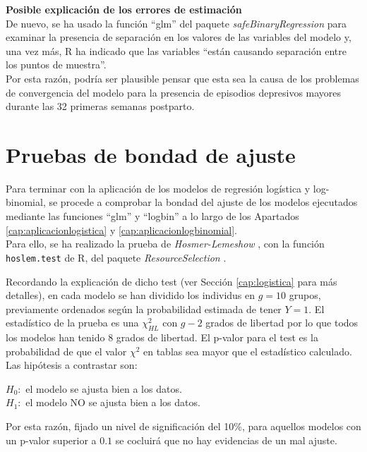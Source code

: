 \textbf{Posible explicación de los errores de estimación}\\
[0.3cm]
De nuevo, se ha usado la función ``glm'' del paquete \textit{safeBinaryRegression} para examinar la presencia de separación en los valores de las variables del modelo y, una vez más, R ha indicado que las variables ``están causando separación entre los puntos de muestra''.\\

Por esta razón, podría ser plausible pensar que esta sea la causa de los problemas de convergencia del modelo para la presencia de episodios depresivos mayores durante las 32 primeras semanas postparto.

\section{Pruebas de bondad de ajuste}\label{cap:bondad}

Para terminar con la aplicación de los modelos de regresión logística y log-binomial, se procede a comprobar la bondad del ajuste de los modelos ejecutados mediante las funciones ``glm'' y ``logbin'' a lo largo de los Apartados \ref{cap:aplicacionlogistica} y  \ref{cap:aplicacionlogbinomial}. \\

Para ello, se ha realizado la prueba de \textit{Hosmer-Lemeshow}  \autocite{hosmer}, con la función \lstinline{hoslem.test} de R,  del paquete \textit{ResourceSelection} \autocite{hoslemtest}.

Recordando la explicación de dicho test (ver Sección \ref{cap:logistica} para más detalles), en cada modelo se han dividido los individus en $g=10$ grupos, previamente ordenados según la probabilidad estimada de tener $Y=1$. El estadístico de la prueba es una $\chi^2_{HL}$ con $g-2$ grados de libertad por lo que todos los modelos han tenido 8 grados de libertad. El p-valor para el test es la probabilidad de que el valor $\chi^2$ en tablas sea mayor que el estadístico calculado. Las hipótesis a contrastar son: 
\begin{center}
	$H_0:$ el modelo se ajusta bien a los datos.\\ 
	$H_1:$ el modelo NO se ajusta bien a los datos. 
\end{center}
Por esta razón, fijado un nivel de significación del 10\%, para aquellos modelos con un p-valor superior a $0.1$ se cocluirá que no hay evidencias de un mal ajuste.\\


